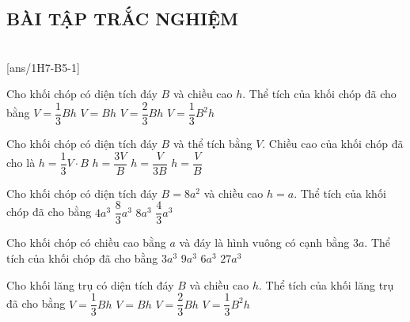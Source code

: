 \subsection{BÀI TẬP TRẮC NGHIỆM}
 \\
\setcounter{ex}{0}
[ans/1H7-B5-1]
\begin{ex}%
	Cho khối chóp có diện tích đáy $B$ và chiều cao $h$. Thể tích của khối chóp đã cho bằng
	\choice
	{\True $V=\dfrac{1}{3}Bh$}
	{$V=Bh$}
	{$V=\dfrac{2}{3}Bh$}
	{$V=\dfrac{1}{3}B^2h$}
\end{ex}
\begin{ex}%
	Cho khối chóp có diện tích đáy $B$ và thể tích bằng $V$. Chiều cao của khối chóp đã cho là
	\choice
	{$h=\dfrac{1}{3}V\cdot B$}
	{\True $h=\dfrac{3V}{B}$}
	{$h=\dfrac{V}{3B}$}
	{$h=\dfrac{V}{B}$}
\end{ex}
\begin{ex}%
	Cho khối chóp có diện tích đáy $B=8a^2$ và chiều cao $h=a$. Thể tích của khối chóp đã cho bằng
	\choice
	{$4a^3$}
	{\True $\dfrac{8}{3}a^3$}
	{$8a^3$}
	{$\dfrac{4}{3}a^3$}
\end{ex}
\begin{ex}%
	Cho khối chóp có chiều cao bằng $a$ và đáy là hình vuông có cạnh bằng $3a$. Thể tích của khối chóp đã cho bằng
	\choice
	{\True $3a^3$}
	{$9a^3$}
	{$6a^3$}
	{$27a^3$}
\end{ex}
\begin{ex}%
	Cho khối lăng trụ có diện tích đáy $B$ và chiều cao $h$. Thể tích của khối lăng trụ đã cho bằng
	\choice
	{$V=\dfrac{1}{3}Bh$}
	{\True $V=Bh$}
	{$V=\dfrac{2}{3}Bh$}
	{$V=\dfrac{1}{3}B^2h$}
\end{ex}
